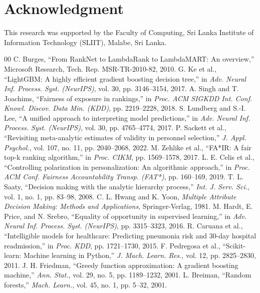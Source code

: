 \documentclass[conference]{IEEEtran}
\begin{document}
\section*{Acknowledgment}
This research was supported by the Faculty of Computing, Sri Lanka Institute of Information Technology (SLIIT), Malabe, Sri Lanka.

\begin{thebibliography}{00}
 C. Burges, ``From RankNet to LambdaRank to LambdaMART: An overview,'' Microsoft Research, Tech. Rep. MSR-TR-2010-82, 2010.
 G. Ke et al., ``LightGBM: A highly efficient gradient boosting decision tree,'' in \textit{Adv. Neural Inf. Process. Syst. (NeurIPS)}, vol. 30, pp. 3146--3154, 2017.
 A. Singh and T. Joachims, ``Fairness of exposure in rankings,'' in \textit{Proc. ACM SIGKDD Int. Conf. Knowl. Discov. Data Min. (KDD)}, pp. 2219--2228, 2018.
 S. Lundberg and S.-I. Lee, ``A unified approach to interpreting model predictions,'' in \textit{Adv. Neural Inf. Process. Syst. (NeurIPS)}, vol. 30, pp. 4765--4774, 2017.
 P. Sackett et al., ``Revisiting meta-analytic estimates of validity in personnel selection,'' \textit{J. Appl. Psychol.}, vol. 107, no. 11, pp. 2040--2068, 2022.
 M. Zehlike et al., ``FA*IR: A fair top-k ranking algorithm,'' in \textit{Proc. CIKM}, pp. 1569--1578, 2017.
 L. E. Celis et al., ``Controlling polarization in personalization: An algorithmic approach,'' in \textit{Proc. ACM Conf. Fairness Accountability Transp. (FAT*)}, pp. 160--169, 2019.
 T. L. Saaty, ``Decision making with the analytic hierarchy process,'' \textit{Int. J. Serv. Sci.}, vol. 1, no. 1, pp. 83--98, 2008.
 C. L. Hwang and K. Yoon, \textit{Multiple Attribute Decision Making: Methods and Applications}, Springer-Verlag, 1981.
 M. Hardt, E. Price, and N. Srebro, ``Equality of opportunity in supervised learning,'' in \textit{Adv. Neural Inf. Process. Syst. (NeurIPS)}, pp. 3315--3323, 2016.
 R. Caruana et al., ``Intelligible models for healthcare: Predicting pneumonia risk and 30-day hospital readmission,'' in \textit{Proc. KDD}, pp. 1721--1730, 2015.
 F. Pedregosa et al., ``Scikit-learn: Machine learning in Python,'' \textit{J. Mach. Learn. Res.}, vol. 12, pp. 2825--2830, 2011.
 J. H. Friedman, ``Greedy function approximation: A gradient boosting machine,'' \textit{Ann. Stat.}, vol. 29, no. 5, pp. 1189--1232, 2001.
 L. Breiman, ``Random forests,'' \textit{Mach. Learn.}, vol. 45, no. 1, pp. 5--32, 2001.

\end{thebibliography}
\end{document}

